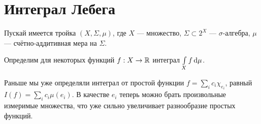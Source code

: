 \documentclass[a4paper]{report}
\begin{document}
    \chapter{Интеграл Лебега}
    Пускай имеется тройка $(X, \Sigma, \mu)$, где $X$ --- множество, $\Sigma \subset 2^X$ --- $\sigma$-алгебра, $\mu$ --- счётно-аддитивная мера на $\Sigma$.

    Определим для некоторых функций $f: X \rightarrow \mathbb{R}$ интеграл $\int\limits_{X}f \operatorname{d}\! \mu$.

    Раньше мы уже определяли интеграл от простой функции  $f = \sum\limits_{i}c_i\chi_{e_i}$, равный $I(f) = \sum\limits_{i}c_i\mu(e_i)$.
    В качестве $e_i$ теперь можно брать произвольные измеримые множества, что уже сильно увеличивает разнообразие простых функций.
\end{document}
